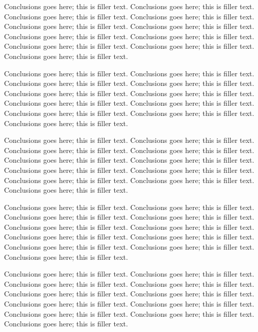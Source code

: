 \documentclass{sig-alternate}
\begin{document}
Conclusions goes here; this is filler text. Conclusions goes here; this is filler text. Conclusions goes here; this is filler text. Conclusions goes here; this is filler text. Conclusions goes here; this is filler text. Conclusions goes here; this is filler text. Conclusions goes here; this is filler text. Conclusions goes here; this is filler text. Conclusions goes here; this is filler text. Conclusions goes here; this is filler text. Conclusions goes here; this is filler text. 

Conclusions goes here; this is filler text. Conclusions goes here; this is filler text. Conclusions goes here; this is filler text. Conclusions goes here; this is filler text. Conclusions goes here; this is filler text. Conclusions goes here; this is filler text. Conclusions goes here; this is filler text. Conclusions goes here; this is filler text. Conclusions goes here; this is filler text. Conclusions goes here; this is filler text. Conclusions goes here; this is filler text. 

Conclusions goes here; this is filler text. Conclusions goes here; this is filler text. Conclusions goes here; this is filler text. Conclusions goes here; this is filler text. Conclusions goes here; this is filler text. Conclusions goes here; this is filler text. Conclusions goes here; this is filler text. Conclusions goes here; this is filler text. Conclusions goes here; this is filler text. Conclusions goes here; this is filler text. Conclusions goes here; this is filler text. 

Conclusions goes here; this is filler text. Conclusions goes here; this is filler text. Conclusions goes here; this is filler text. Conclusions goes here; this is filler text. Conclusions goes here; this is filler text. Conclusions goes here; this is filler text. Conclusions goes here; this is filler text. Conclusions goes here; this is filler text. Conclusions goes here; this is filler text. Conclusions goes here; this is filler text. Conclusions goes here; this is filler text. 

Conclusions goes here; this is filler text. Conclusions goes here; this is filler text. Conclusions goes here; this is filler text. Conclusions goes here; this is filler text. Conclusions goes here; this is filler text. Conclusions goes here; this is filler text. Conclusions goes here; this is filler text. Conclusions goes here; this is filler text. Conclusions goes here; this is filler text. Conclusions goes here; this is filler text. Conclusions goes here; this is filler text. 
\end{document}
